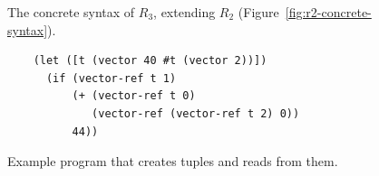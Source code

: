 \documentclass[11pt]{book}
\newcommand{\gray}[1]{{\color{gray} #1}}
\begin{document}
\begin{figure}[tbp]
\centering
\fbox{
\begin{minipage}{0.96\textwidth}
\[
\begin{array}{lcl}
  \Type &::=& \gray{\key{Integer} \mid \key{Boolean}}
  \mid (\key{Vector}\;\Type\ldots) \mid \key{Void}\\
  \Exp &::=& \gray{  \Int \mid (\key{read}) \mid (\key{-}\;\Exp) \mid (\key{+} \; \Exp\;\Exp) \mid (\key{-}\;\Exp\;\Exp) }  \\
  &\mid&  \gray{  \Var \mid (\key{let}~([\Var~\Exp])~\Exp)  }\\
  &\mid& \gray{ \key{\#t} \mid \key{\#f} 
   \mid (\key{and}\;\Exp\;\Exp) 
   \mid (\key{or}\;\Exp\;\Exp)
   \mid (\key{not}\;\Exp) } \\
  &\mid& \gray{  (\itm{cmp}\;\Exp\;\Exp) 
   \mid (\key{if}~\Exp~\Exp~\Exp)  } \\
  &\mid& (\key{vector}\;\Exp\ldots) 
   \mid (\key{vector-ref}\;\Exp\;\Int) \\
  &\mid& (\key{vector-set!}\;\Exp\;\Int\;\Exp)\\
  &\mid& (\key{void}) \mid (\key{has-type}~\Exp~\Type)\\
  R_3 &::=& \Exp
\end{array}
\]
\end{minipage}
}
\caption{The concrete syntax of $R_3$, extending $R_2$
  (Figure~\ref{fig:r2-concrete-syntax}).}
\label{fig:r3-concrete-syntax}
\end{figure}

\begin{figure}[tbp]
\begin{lstlisting}
    (let ([t (vector 40 #t (vector 2))])
      (if (vector-ref t 1)
          (+ (vector-ref t 0)
             (vector-ref (vector-ref t 2) 0))
          44))
\end{lstlisting}
\caption{Example program that creates tuples and reads from them.}
\label{fig:vector-eg}
\end{figure}
\end{document}
